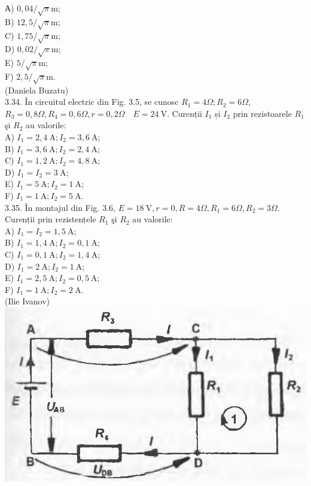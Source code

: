 \documentclass[10pt]{article}
\begin{document}
А) $0,04 / \sqrt{\pi} \mathrm{m}$;\\
B) $12,5 / \sqrt{\pi} \mathrm{m}$;\\
C) $1,75 / \sqrt{\pi} \mathrm{m}$;\\
D) $0,02 / \sqrt{\pi} \mathrm{m}$;\\
E) $5 / \sqrt{\pi} \mathrm{m}$;\\
F) $2,5 / \sqrt{\pi} \mathrm{m}$.\\
(Daniela Buzatu)\\
3.34. În circuitul electric din Fig. 3.5, se cunosc $R_{1}=4 \Omega ; R_{2}=6 \Omega$, $R_{3}=0,8 \Omega, R_{4}=0,6 \Omega, r=0,2 \Omega \quad E=24 \mathrm{~V}$. Curenții $I_{1}$ și $I_{2}$ prin rezistoarele $R_{1}$ şi $R_{2}$ au valorile:\\
A) $I_{1}=2,4 \mathrm{~A} ; I_{2}=3,6 \mathrm{~A}$;\\
B) $I_{1}=3,6 \mathrm{~A} ; I_{2}=2,4 \mathrm{~A}$;\\
C) $I_{1}=1,2 \mathrm{~A} ; I_{2}=4,8 \mathrm{~A}$;\\
D) $I_{1}=I_{2}=3 \mathrm{~A}$;\\
E) $I_{1}=5 \mathrm{~A} ; I_{2}=1 \mathrm{~A}$;\\
F) $I_{1}=1 \mathrm{~A} ; I_{2}=5 \mathrm{~A}$.\\
3.35. În montajul din Fig. 3.6, $E=18 \mathrm{~V}, r=0, R=4 \Omega, R_{1}=6 \Omega, R_{2}=3 \Omega$. Curenții prin rezistențele $R_{1}$ şi $R_{2}$ au valorile:\\
A) $I_{1}=I_{2}=1,5 \mathrm{~A}$;\\
B) $I_{1}=1,4 \mathrm{~A} ; I_{2}=0,1 \mathrm{~A}$;\\
C) $I_{1}=0,1 \mathrm{~A} ; I_{2}=1,4 \mathrm{~A}$;\\
D) $I_{1}=2 \mathrm{~A} ; I_{2}=1 \mathrm{~A}$;\\
E) $I_{1}=2,5 \mathrm{~A} ; I_{2}=0,5 \mathrm{~A}$;\\
F) $I_{1}=1 \mathrm{~A} ; I_{2}=2 \mathrm{~A}$.\\
(Ilie Ivanov)\\
\includegraphics[max width=\textwidth, center]{2025_07_01_5b3ff9fa0d508c8e9f17g-151(3)}
\end{document}

